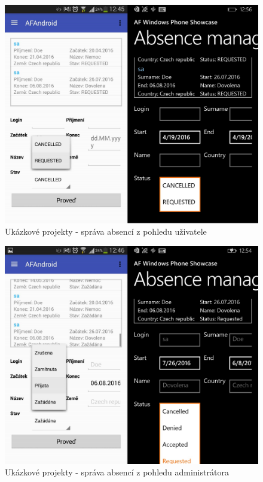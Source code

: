 \begin{figure}
\includegraphics[width=\linewidth]{figures/screenshots/AbsenceManagement}
\caption{Ukázkové projekty - správa absencí z pohledu uživatele}
\label{img:AbsenceManagement}
\end{figure}	

\begin{figure}
\includegraphics[width=\linewidth]{figures/screenshots/AbsenceManagementAdmin}
\caption{Ukázkové projekty - správa absencí z pohledu administrátora}
\label{img:AbsenceManagementAdmin}
\end{figure}	

